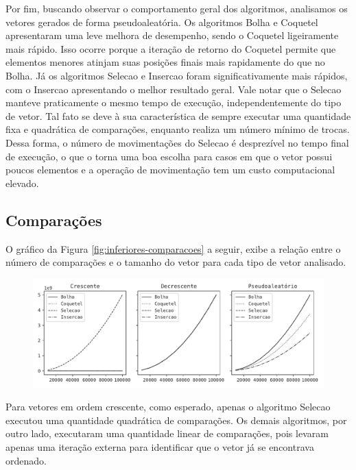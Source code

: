 Por fim, buscando observar o comportamento geral dos algoritmos, analisamos os vetores gerados de forma pseudoaleatória. Os algoritmos Bolha e Coquetel apresentaram uma leve melhora de desempenho, sendo o Coquetel ligeiramente mais rápido. Isso ocorre porque a iteração de retorno do Coquetel permite que elementos menores atinjam suas posições finais mais rapidamente do que no Bolha. Já os algoritmos Selecao e Insercao foram significativamente mais rápidos, com o Insercao apresentando o melhor resultado geral. Vale notar que o Selecao manteve praticamente o mesmo tempo de execução, independentemente do tipo de vetor. Tal fato se deve à sua característica de sempre executar uma quantidade fixa e quadrática de comparações, enquanto realiza um número mínimo de trocas. Dessa forma, o número de movimentações do Selecao é desprezível no tempo final de execução, o que o torna uma boa escolha para casos em que o vetor possui poucos elementos e a operação de movimentação tem um custo computacional elevado.


\subsection{Comparações}
O gráfico da Figura \ref{fig:inferiores-comparacoes} a seguir, exibe a relação entre o número de comparações e o tamanho do vetor para cada tipo de vetor analisado.

\begin{figure}[H]
\centering
\includegraphics[scale=0.787]{figuras/pdf/inferiores.comparacoes.pdf}
\end{figure}

Para vetores em ordem crescente, como esperado, apenas o algoritmo Selecao executou uma quantidade quadrática de comparações. Os demais algoritmos, por outro lado, executaram uma quantidade linear de comparações, pois levaram apenas uma iteração externa para identificar que o vetor já se encontrava ordenado.

